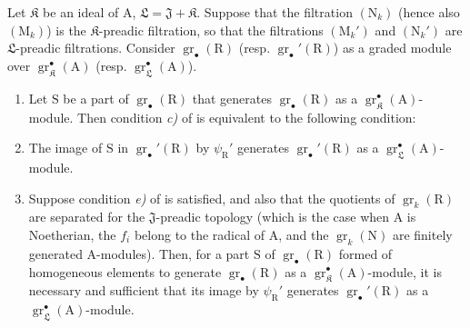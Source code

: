 \begin{corollary}[19.6.4]
\label{IV.19.6.4}
Let $\mathfrak K$ be an ideal of $\mathrm{A}$, $\mathfrak{L}=\mathfrak{J}+\mathfrak K$. Suppose that the filtration $(\mathrm{N}_k)$ (hence also $(\mathrm{M}_k)$) is the $\mathfrak K$-preadic filtration, so that the filtrations $(\mathrm{M}_k')$ and $(\mathrm{N}_k')$ are $\mathfrak{L}$-preadic filtrations. Consider $\operatorname{gr}_\bullet(\mathrm{R})$ \textup{(resp. $\operatorname{gr}_\bullet'(\mathrm{R})$)} as a graded module over $\operatorname{gr}_\mathfrak K^\bullet(\mathrm{A})$ \textup{(resp. $\operatorname{gr}_\mathfrak{L}^\bullet(\mathrm{A})$)}.
\begin{enumerate}
\item[\rm(i)] Let $\mathrm{S}$ be a part of $\operatorname{gr}_\bullet(\mathrm{R})$ that generates $\operatorname{gr}_\bullet(\mathrm{R})$ as a $\operatorname{gr}_\mathfrak K^\bullet(\mathrm{A})$-module. Then condition \emph{c)} of \emph{} is equivalent to the following condition:
\item[\rm \textup{c$'$)}] The image of $\mathrm{S}$ in $\operatorname{gr}_\bullet'(\mathrm{R})$ by $\psi_\mathrm{R}'$ generates $\operatorname{gr}_\bullet'(\mathrm{R})$ as a $\operatorname{gr}_\mathfrak{L}^\bullet(\mathrm{A})$-module.
\item[\rm(ii)] Suppose condition \emph{e)} of \emph{} is satisfied, and also that the quotients of $\operatorname{gr}_k(\mathrm{R})$ are separated for the $\mathfrak{J}$-preadic topology \textup{(which is the case when $\mathrm{A}$ is Noetherian, the $f_i$ belong to the radical of $\mathrm{A}$, and the $\operatorname{gr}_k(\mathrm{N})$ are finitely generated $\mathrm{A}$-modules)}. Then, for a part $\mathrm{S}$ of $\operatorname{gr}_\bullet(\mathrm{R})$ formed of homogeneous elements to generate $\operatorname{gr}_\bullet(\mathrm{R})$ as a $\operatorname{gr}_\mathfrak K^\bullet(\mathrm{A})$-module, it is necessary and sufficient that its image by $\psi_\mathrm{R}'$ generates $\operatorname{gr}_\bullet'(\mathrm{R})$ as a $\operatorname{gr}_\mathfrak{L}^\bullet(\mathrm{A})$-module.
\end{enumerate}
\end{corollary}

